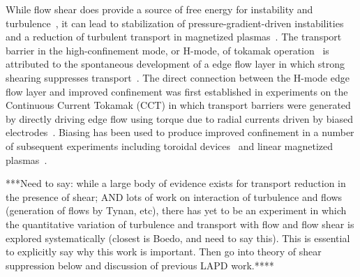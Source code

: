 \documentclass[aps,prl,amsmath,amssymb,preprint,superscriptaddress]{revtex4}
\begin{document}

While flow shear does provide a source of free energy for instability and turbulence~\cite{}, it can lead to stabilization of pressure-gradient-driven instabilities and a reduction of turbulent transport in magnetized plasmas~\cite{}.  The transport barrier in the high-confinement mode, or H-mode, of tokamak operation~\cite{wagner82} is attributed to the spontaneous development of a edge flow layer in which  strong shearing suppresses transport~\cite{burrell, terry, hahm?}.  The direct connection between the H-mode edge flow layer and improved confinement was first established in experiments on the Continuous Current Tokamak (CCT) in which transport barriers were generated by directly driving edge flow using torque due to radial currents driven by biased electrodes~\cite{taylor89,tynan92}.  Biasing has been used to produce improved confinement in a number of subsequent experiments including toroidal devices~\cite{boedo00,RFP,Stell,TJK, etc} and linear magnetized plasmas~\cite{maggs07,carter09,mirror}.  


***Need to say: while a large body of evidence exists for transport reduction in the presence of shear; AND lots of work on interaction of turbulence and flows (generation of flows by Tynan, etc), there has yet to be an experiment in which the quantitative variation of turbulence and transport with flow and flow shear is explored systematically (closest is Boedo, and need to say this).  This is essential to explicitly say why this work is important. Then go into theory of shear suppression below and discussion of previous LAPD work.****
\end{document}
